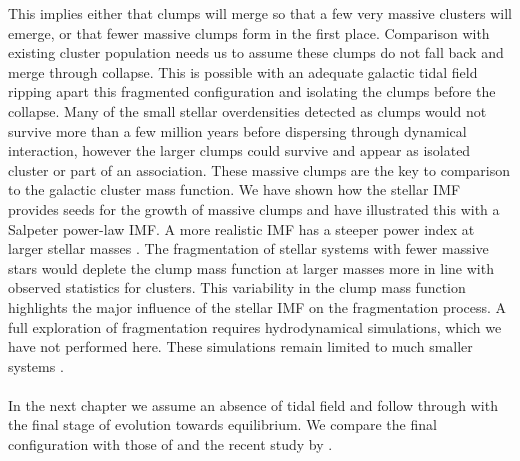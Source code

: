 This implies either that clumps will merge so that a few very massive clusters will emerge, or that fewer massive clumps form in the first place. Comparison with existing cluster population needs us to assume these clumps do not fall back and merge through collapse. This is possible with an adequate galactic tidal field ripping apart this fragmented configuration and isolating the clumps before the collapse. Many of the small stellar overdensities detected as clumps would not survive more than a few million years before dispersing through dynamical interaction, however the larger clumps could survive and appear as isolated cluster or part of an association. These massive clumps   are the key to comparison to the galactic cluster mass function. We have shown how the stellar IMF provides seeds for the growth of massive clumps and have illustrated this with a Salpeter power-law IMF. A more realistic  IMF has a steeper power index at larger stellar masses \citep{Kroupa2002,Chabrier2005}. The fragmentation of stellar systems with fewer massive stars would deplete the clump mass function at larger masses more in line with observed statistics for clusters. 
This variability in the clump mass function highlights the major influence of the stellar IMF on the fragmentation process. A full exploration of fragmentation requires hydrodynamical simulations, which we have not performed here. These simulations remain limited to much smaller systems \citep{Bate2014,Lomax2014}.

\paragraph*{}
In the next chapter we assume an absence of tidal field and follow through with the final stage of evolution towards equilibrium. We compare the final configuration with those of \cite{Allison2009} and the recent study by \cite{Caputo2014}. 
